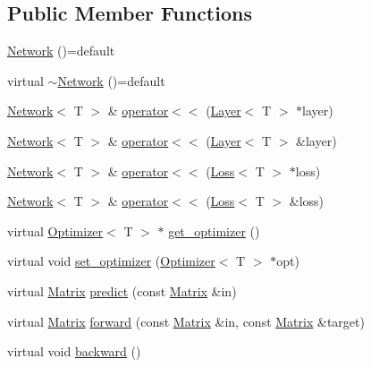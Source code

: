 \subsection*{Public Member Functions}
\begin{DoxyCompactItemize}
\item 
\mbox{\hyperlink{class_network_aa2db3657dea83a6a152633a8eb4d41ce}{Network}} ()=default
\item 
virtual \mbox{\hyperlink{class_network_a9717c0b897ff9d602ad91f57159ba4dd}{$\sim$\+Network}} ()=default
\item 
\mbox{\hyperlink{class_network}{Network}}$<$ T $>$ \& \mbox{\hyperlink{class_network_a692179465a98c66b8797dfe880e9b283}{operator$<$$<$}} (\mbox{\hyperlink{class_layer}{Layer}}$<$ T $>$ $\ast$layer)
\item 
\mbox{\hyperlink{class_network}{Network}}$<$ T $>$ \& \mbox{\hyperlink{class_network_ad7c9d63ed466e31bf9a51fa4f3e23d7b}{operator$<$$<$}} (\mbox{\hyperlink{class_layer}{Layer}}$<$ T $>$ \&layer)
\item 
\mbox{\hyperlink{class_network}{Network}}$<$ T $>$ \& \mbox{\hyperlink{class_network_a79f5d0ee00c5d7dd88a7daa637e6b33d}{operator$<$$<$}} (\mbox{\hyperlink{class_loss}{Loss}}$<$ T $>$ $\ast$loss)
\item 
\mbox{\hyperlink{class_network}{Network}}$<$ T $>$ \& \mbox{\hyperlink{class_network_aa31b66b394dd1221a8c090dc21a87de8}{operator$<$$<$}} (\mbox{\hyperlink{class_loss}{Loss}}$<$ T $>$ \&loss)
\item 
virtual \mbox{\hyperlink{class_optimizer}{Optimizer}}$<$ T $>$ $\ast$ \mbox{\hyperlink{class_network_aca741bb11b2d6070727d7bc306e2acfc}{get\+\_\+optimizer}} ()
\item 
virtual void \mbox{\hyperlink{class_network_a1b4d20bb15c3caddb1b648f96d682722}{set\+\_\+optimizer}} (\mbox{\hyperlink{class_optimizer}{Optimizer}}$<$ T $>$ $\ast$opt)
\item 
virtual \mbox{\hyperlink{class_network_a3217727df6a4bde68fb686293258d7f6}{Matrix}} \mbox{\hyperlink{class_network_a7359736e7e47ad98b4946b1b719c1c30}{predict}} (const \mbox{\hyperlink{class_network_a3217727df6a4bde68fb686293258d7f6}{Matrix}} \&in)
\item 
virtual \mbox{\hyperlink{class_network_a3217727df6a4bde68fb686293258d7f6}{Matrix}} \mbox{\hyperlink{class_network_aff4e815a38ab13b083676bef1b8ff1a9}{forward}} (const \mbox{\hyperlink{class_network_a3217727df6a4bde68fb686293258d7f6}{Matrix}} \&in, const \mbox{\hyperlink{class_network_a3217727df6a4bde68fb686293258d7f6}{Matrix}} \&target)
\item 
virtual void \mbox{\hyperlink{class_network_a0656d4106aded16e8663ff8fbfec1f3e}{backward}} ()
\end{DoxyCompactItemize}
